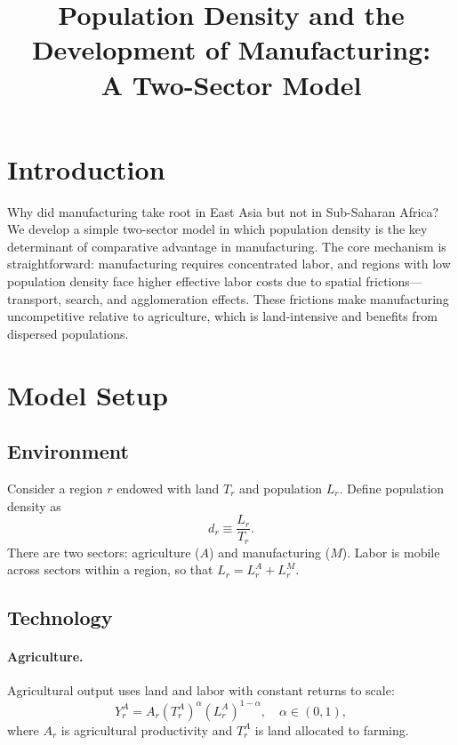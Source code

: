 \documentclass[12pt]{article}
\title{Population Density and the Development of Manufacturing:\\ A Two-Sector Model}
\author{}
\date{}
\begin{document}
\maketitle

\section{Introduction}

Why did manufacturing take root in East Asia but not in Sub-Saharan Africa? We develop a simple two-sector model in which population density is the key determinant of comparative advantage in manufacturing. The core mechanism is straightforward: manufacturing requires concentrated labor, and regions with low population density face higher effective labor costs due to spatial frictions---transport, search, and agglomeration effects. These frictions make manufacturing uncompetitive relative to agriculture, which is land-intensive and benefits from dispersed populations.

\section{Model Setup}

\subsection{Environment}

Consider a region $r$ endowed with land $T_r$ and population $L_r$. Define population density as
\[
    d_r \equiv \frac{L_r}{T_r}.
\]
There are two sectors: agriculture ($A$) and manufacturing ($M$). Labor is mobile across sectors within a region, so that $L_r = L_r^A + L_r^M$.

\subsection{Technology}

\paragraph{Agriculture.} Agricultural output uses land and labor with constant returns to scale:
\[
    Y_r^A = A_r \left(T_r^A\right)^\alpha \left(L_r^A\right)^{1-\alpha}, \quad \alpha \in (0,1),
\]
where $A_r$ is agricultural productivity and $T_r^A$ is land allocated to farming.
\end{document}
